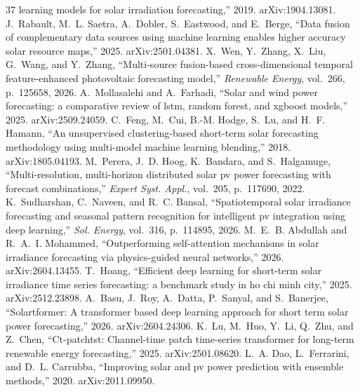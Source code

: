 \begin{thebibliography}{37}
  learning models for solar irradiation forecasting,'' 2019.
\newblock arXiv:1904.13081.
 J.~Rabault, M.~L. Saetra, A.~Dobler, S.~Eastwood, and E.~Berge, ``Data fusion
  of complementary data sources using machine learning enables higher accuracy
  solar resource maps,'' 2025.
\newblock arXiv:2501.04381.
 X.~Wen, Y.~Zhang, X.~Liu, G.~Wang, and Y.~Zhang, ``Multi-source fusion-based
  cross-dimensional temporal feature-enhanced photovoltaic forecasting model,''
  {\em Renewable Energy}, vol.~266, p.~125658, 2026.
 A.~Mollasalehi and A.~Farhadi, ``Solar and wind power forecasting: a
  comparative review of lstm, random forest, and xgboost models,'' 2025.
\newblock arXiv:2509.24059.
 C.~Feng, M.~Cui, B.-M. Hodge, S.~Lu, and H.~F. Hamann, ``An unsupervised
  clustering-based short-term solar forecasting methodology using multi-model
  machine learning blending,'' 2018.
\newblock arXiv:1805.04193.
 M.~Perera, J.~D. Hoog, K.~Bandara, and S.~Halgamuge, ``Multi-resolution,
  multi-horizon distributed solar pv power forecasting with forecast
  combinations,'' {\em Expert Syst. Appl.}, vol.~205, p.~117690, 2022.
 K.~Sudharshan, C.~Naveen, and R.~C. Bansal, ``Spatiotemporal solar irradiance
  forecasting and seasonal pattern recognition for intelligent pv integration
  using deep learning,'' {\em Sol. Energy}, vol.~316, p.~114895, 2026.
 M.~E.~B. Abdullah and R.~A.~I. Mohammed, ``Outperforming self-attention
  mechanisms in solar irradiance forecasting via physics-guided neural
  networks,'' 2026.
\newblock arXiv:2604.13455.
 T.~Hoang, ``Efficient deep learning for short-term solar irradiance time series
  forecasting: a benchmark study in ho chi minh city,'' 2025.
\newblock arXiv:2512.23898.
 A.~Basu, J.~Roy, A.~Datta, P.~Sanyal, and S.~Banerjee, ``Solartformer: A
  transformer based deep learning approach for short term solar power
  forecasting,'' 2026.
\newblock arXiv:2604.24306.
 K.~Lu, M.~Huo, Y.~Li, Q.~Zhu, and Z.~Chen, ``Ct-patchtst: Channel-time patch
  time-series transformer for long-term renewable energy forecasting,'' 2025.
\newblock arXiv:2501.08620.
 L.~A. Dao, L.~Ferrarini, and D.~L. Carrubba, ``Improving solar and pv power
  prediction with ensemble methods,'' 2020.
\newblock arXiv:2011.09950.

\end{thebibliography}
